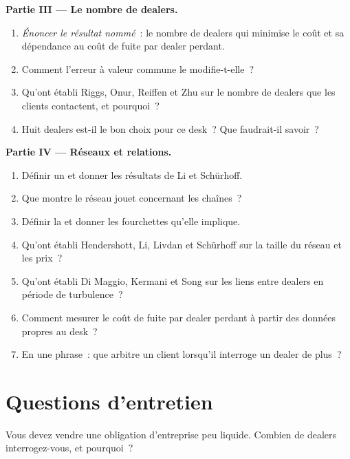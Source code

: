 \begin{problem}
\medskip\noindent\textbf{Partie III --- Le nombre de dealers.}
\begin{enumerate}[resume]
\item \emph{Énoncer le résultat nommé}~: le nombre de dealers qui minimise le coût et sa dépendance au coût de fuite par dealer perdant.
\item Comment l'erreur à valeur commune le modifie-t-elle~?
\item Qu'ont établi Riggs, Onur, Reiffen et Zhu sur le nombre de dealers que les clients contactent, et pourquoi~?
\item Huit dealers est-il le bon choix pour ce desk~? Que faudrait-il savoir~?
\end{enumerate}

\medskip\noindent\textbf{Partie IV --- Réseaux et relations.}
\begin{enumerate}[resume]
\item Définir un  et donner les résultats de Li et Schürhoff.
\item Que montre le réseau jouet concernant les chaînes~?
\item Définir la  et donner les fourchettes qu'elle implique.
\item Qu'ont établi Hendershott, Li, Livdan et Schürhoff sur la taille du réseau et les prix~?
\item Qu'ont établi Di Maggio, Kermani et Song sur les liens entre dealers en période de turbulence~?
\item Comment mesurer le coût de fuite par dealer perdant à partir des données propres au desk~?
\item En une phrase~: que arbitre un client lorsqu'il interroge un dealer de plus~?
\end{enumerate}
\end{problem}

\section{Questions d'entretien}

\begin{interviewq}\label{iq:mx:request-for-quote-and-dealer-markets-in-theory:1}
Vous devez vendre une obligation d'entreprise peu liquide. Combien de dealers interrogez-vous, et pourquoi~?
\end{interviewq}

